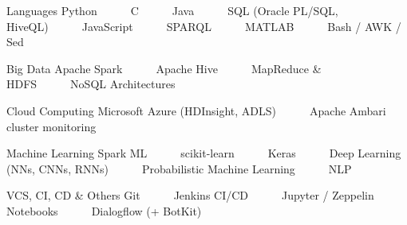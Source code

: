 

\begin{cvskills}

  \cvskill
    {Languages} %
    {Python~~~\textbullet~~~C~~~\textbullet~~~Java~~~\textbullet~~~SQL (Oracle PL/SQL, HiveQL)~~~\textbullet~~~JavaScript~~~\textbullet~~~SPARQL~~~\textbullet~~~MATLAB~~~\textbullet~~~Bash / AWK / Sed} %

  \cvskill
    {Big Data} %
    {Apache Spark~~~\textbullet~~~Apache Hive~~~\textbullet~~~MapReduce \& HDFS~~~\textbullet~~~NoSQL Architectures} %
    
\cvskill
    {Cloud Computing} %
    {Microsoft Azure (HDInsight, ADLS)~~~\textbullet~~~Apache Ambari cluster monitoring} %

  \cvskill
    {Machine Learning} %
    {Spark ML~~~\textbullet~~~scikit-learn~~~\textbullet~~~Keras~~~\textbullet~~~Deep Learning (NNs, CNNs, RNNs)~~~\textbullet~~~Probabilistic Machine Learning~~~\textbullet~~~NLP} %

  \cvskill
    {VCS, CI, CD \& Others} %
    {Git~~~\textbullet~~~Jenkins CI/CD~~~\textbullet~~~Jupyter / Zeppelin Notebooks~~~\textbullet~~~Dialogflow (+ BotKit)} %

\end{cvskills}
